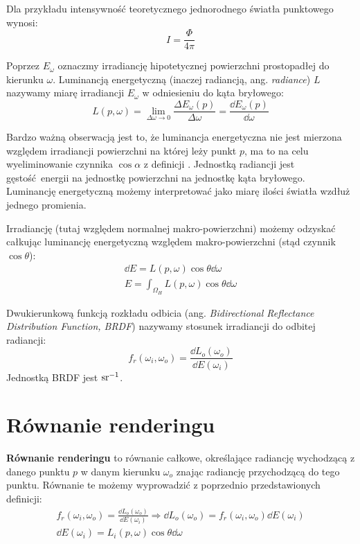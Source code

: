 \documentclass[../main.tex]{subfiles}
\begin{document}
Dla przykładu intensywność teoretycznego jednorodnego światła punktowego wynosi:
\[
  I = \frac{\Phi}{4\pi}
\]

Poprzez $E_{\omega}$ oznaczmy irradiancję hipotetycznej powierzchni
prostopadłej do kierunku $\omega$. Luminancją energetyczną (inaczej radiancją, ang. \textit{radiance}) $L$ nazywamy miarę irradiancji $E_{\omega}$ w odniesieniu do kąta bryłowego:
\[
L(p, \omega) = \lim_{\Delta\omega \rightarrow 0} {
  \frac{\Delta E_{\omega} (p)}{\Delta\omega}
} =
\frac{\dd E_{\omega}(p)}{\dd \omega}
\]

Bardzo ważną obserwacją jest to, że luminancja energetyczna nie jest mierzona względem irradiancji powierzchni na której leży punkt $p$, ma to na celu wyeliminowanie czynnika $\cos \alpha$ z definicji \cite[str. 339]{pbrt}. Jednostką radiancji jest gęstość energii na jednostkę powierzchni na jednostkę kąta bryłowego. Luminancję energetyczną możemy interpretować jako miarę ilości światła wzdłuż jednego promienia.

Irradiancję (tutaj względem normalnej makro-powierzchni) możemy odzyskać całkując luminancję energetyczną względem makro-powierzchni (stąd czynnik $\cos\theta$):
\begin{gather*}
    \dd E = L(p, \omega) \cos\theta \dd \omega \\
    E = \int_{\Omega_H}{L(p, \omega) \cos\theta \dd \omega}
\end{gather*}

Dwukierunkową funkcją rozkładu odbicia (ang. \textit{Bidirectional Reflectance Distribution Function, BRDF}) nazywamy stosunek irradiancji do odbitej radiancji:
\[
f_r(\omega_i, \omega_o) = \frac{
    \dd L_{o}(\omega_o)
}{
    \dd E(\omega_i)
}
\]
\noindent Jednostką BRDF jest $\si[per-mode=reciprocal]{\per\steradian}$.

\section{Równanie renderingu}

\textbf{Równanie renderingu} to równanie całkowe, określające radiancję wychodzącą z danego punktu $p$ w danym kierunku $\omega_o$ znając radiancję przychodzącą do tego punktu. Równanie te możemy
wyprowadzić z poprzednio przedstawionych definicji:
\begin{gather*}
    f_r(\omega_i, \omega_o) = \frac{
        \dd L_{o}(\omega_o)
    }{
        \dd E(\omega_i)
    } \Rightarrow 
    \dd L_{o}(\omega_o) =  f_r(\omega_i, \omega_o) \dd E(\omega_i) \\
    \dd E(\omega_i) = L_i(p, \omega) \cos\theta \dd\omega
\end{gather*}
\end{document}
